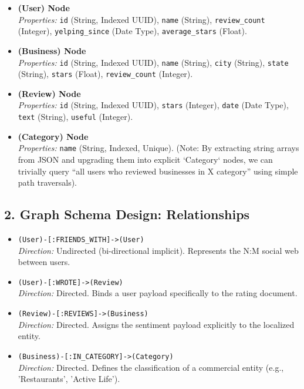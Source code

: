\documentclass[11pt,a4paper]{article}
\begin{document}
\begin{itemize}
    \item \textbf{(User) Node}\\
    \textit{Properties:} \texttt{id} (String, Indexed UUID), \texttt{name} (String), \texttt{review\_count} (Integer), \texttt{yelping\_since} (Date Type), \texttt{average\_stars} (Float).
    
    \item \textbf{(Business) Node}\\
    \textit{Properties:} \texttt{id} (String, Indexed UUID), \texttt{name} (String), \texttt{city} (String), \texttt{state} (String), \texttt{stars} (Float), \texttt{review\_count} (Integer).
    
    \item \textbf{(Review) Node}\\
    \textit{Properties:} \texttt{id} (String, Indexed UUID), \texttt{stars} (Integer), \texttt{date} (Date Type), \texttt{text} (String), \texttt{useful} (Integer).
    
    \item \textbf{(Category) Node}\\
    \textit{Properties:} \texttt{name} (String, Indexed, Unique). (Note: By extracting string arrays from JSON and upgrading them into explicit `Category` nodes, we can trivially query ``all users who reviewed businesses in X category'' using simple path traversals).
\end{itemize}

\subsection*{2. Graph Schema Design: Relationships}
\begin{itemize}
    \item \texttt{(User)-[:FRIENDS\_WITH]->(User)}\\
    \textit{Direction:} Undirected (bi-directional implicit). Represents the N:M social web between users.
    \item \texttt{(User)-[:WROTE]->(Review)}\\
    \textit{Direction:} Directed. Binds a user payload specifically to the rating document.
    \item \texttt{(Review)-[:REVIEWS]->(Business)}\\
    \textit{Direction:} Directed. Assigns the sentiment payload explicitly to the localized entity.
    \item \texttt{(Business)-[:IN\_CATEGORY]->(Category)}\\
    \textit{Direction:} Directed. Defines the classification of a commercial entity (e.g., 'Restaurants', 'Active Life').
\end{itemize}
\end{document}
